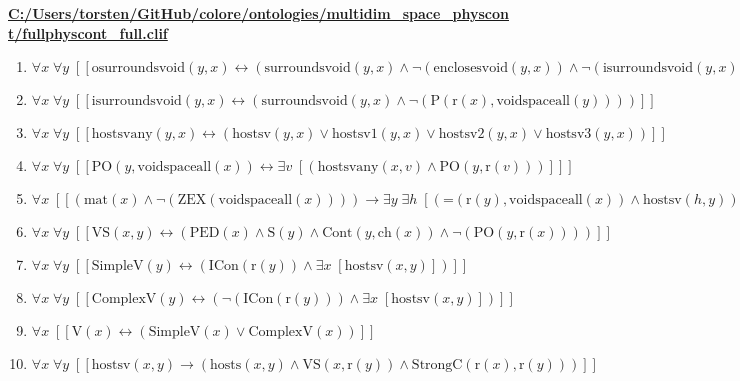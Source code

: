 \documentclass{article}
\begin{document}
\textbf{\url{C:/Users/torsten/GitHub/colore/ontologies/multidim\_space\_physcont/fullphyscont\_full.clif}}

\begin{enumerate}
\item $\forall x\; \forall y\;  \left[ \left[ \textrm{osurroundsvoid}(y,x) \leftrightarrow \left(\textrm{surroundsvoid}(y,x) \land \neg \left(\textrm{enclosesvoid}(y,x)\right) \land \neg \left(\textrm{isurroundsvoid}(y,x)\right)\right) \right] \right]$
\item $\forall x\; \forall y\;  \left[ \left[ \textrm{isurroundsvoid}(y,x) \leftrightarrow \left(\textrm{surroundsvoid}(y,x) \land \neg \left(\textrm{P}(\textrm{r}(x),\textrm{voidspaceall}(y))\right)\right) \right] \right]$
\item $\forall x\; \forall y\;  \left[ \left[ \textrm{hostsvany}(y,x) \leftrightarrow \left(\textrm{hostsv}(y,x) \lor \textrm{hostsv1}(y,x) \lor \textrm{hostsv2}(y,x) \lor \textrm{hostsv3}(y,x)\right) \right] \right]$
\item $\forall x\; \forall y\;  \left[ \left[ \textrm{PO}(y,\textrm{voidspaceall}(x)) \leftrightarrow \exists v\;  \left[ \left(\textrm{hostsvany}(x,v) \land \textrm{PO}(y,\textrm{r}(v))\right) \right] \right] \right]$
\item $\forall x\;  \left[ \left[ \left(\textrm{mat}(x) \land \neg \left(\textrm{ZEX}(\textrm{voidspaceall}(x))\right)\right) \rightarrow \exists y\; \exists h\;  \left[ \left(\textrm{=}(\textrm{r}(y),\textrm{voidspaceall}(x)) \land \textrm{hostsv}(h,y)\right) \right] \right] \right]$
\item $\forall x\; \forall y\;  \left[ \left[ \textrm{VS}(x,y) \leftrightarrow \left(\textrm{PED}(x) \land \textrm{S}(y) \land \textrm{Cont}(y,\textrm{ch}(x)) \land \neg \left(\textrm{PO}(y,\textrm{r}(x))\right)\right) \right] \right]$
\item $\forall x\; \forall y\;  \left[ \left[ \textrm{SimpleV}(y) \leftrightarrow \left(\textrm{ICon}(\textrm{r}(y)) \land \exists x\;  \left[ \textrm{hostsv}(x,y) \right]\right) \right] \right]$
\item $\forall x\; \forall y\;  \left[ \left[ \textrm{ComplexV}(y) \leftrightarrow \left(\neg \left(\textrm{ICon}(\textrm{r}(y))\right) \land \exists x\;  \left[ \textrm{hostsv}(x,y) \right]\right) \right] \right]$
\item $\forall x\;  \left[ \left[ \textrm{V}(x) \leftrightarrow \left(\textrm{SimpleV}(x) \lor \textrm{ComplexV}(x)\right) \right] \right]$
\item $\forall x\; \forall y\;  \left[ \left[ \textrm{hostsv}(x,y) \rightarrow \left(\textrm{hosts}(x,y) \land \textrm{VS}(x,\textrm{r}(y)) \land \textrm{StrongC}(\textrm{r}(x),\textrm{r}(y))\right) \right] \right]$

\end{enumerate}
\end{document}
